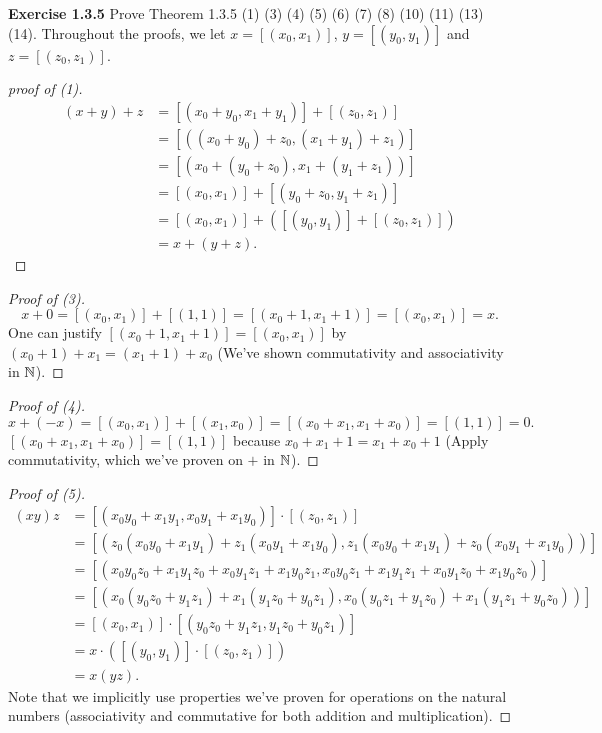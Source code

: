 \newpage
\noindent \textbf{Exercise 1.3.5} Prove Theorem 1.3.5 (1) (3) (4) (5) (6) (7) (8) (10) (11) (13) (14).
Throughout the proofs, we let \(x = [(x_0, x_1)]\), \(y = [(y_0, y_1)]\) and \(z = [(z_0, z_1)]\).
\begin{proof}[proof of (1)]
    \begin{align*}
        (x+y)+z &= [(x_0 + y_0, x_1 + y_1)] + [(z_0, z_1)]\\
        &= [((x_0 + y_0) + z_0, (x_1 + y_1) + z_1)]\\
        &= [(x_0 + (y_0 + z_0), x_1 + (y_1 + z_1))]\\
        &= [(x_0, x_1)] + [(y_0 + z_0, y_1 + z_1)]\\
        &= [(x_0, x_1)] + ([(y_0, y_1)] + [(z_0, z_1)])\\
        &= x + (y+z).
    \end{align*}
\end{proof}
\begin{proof}[Proof of (3)]
    \[x + 0 = [(x_0, x_1)] + [(1,1)] = [(x_0 + 1, x_1 + 1)] = [(x_0, x_1)] = x.\]
    One can justify \([(x_0+1, x_1 + 1)] = [(x_0, x_1)]\) by \((x_0 + 1) + x_1 = (x_1 + 1) + x_0\) (We've shown commutativity and associativity in \(\mathbb{N}\)).
\end{proof}
\begin{proof}[Proof of (4)]
    \[x + (-x) = [(x_0, x_1)] + [(x_1, x_0)] = [(x_0+x_1, x_1+x_0)] = [(1,1)] = 0.\]
    \([(x_0+x_1, x_1+x_0)] = [(1,1)]\) because \(x_0 + x_1 + 1 = x_1 + x_0 + 1\) (Apply commutativity, which we've proven on \(+\) in \(\mathbb{N}\)).
\end{proof}
\begin{proof}[Proof of (5)]
    \begin{align*}
        (xy)z &= [(x_0y_0+x_1y_1, x_0y_1+x_1y_0)] \cdot [(z_0, z_1)] \\
        &= [(z_0(x_0y_0+x_1y_1) + z_1(x_0y_1 + x_1y_0), z_1(x_0y_0 + x_1y_1) + z_0(x_0y_1+x_1y_0))]\\
        &= [(x_0y_0z_0 + x_1y_1z_0 + x_0y_1z_1 + x_1y_0z_1, x_0y_0z_1 + x_1y_1z_1 + x_0y_1z_0 + x_1y_0z_0)]\\
        &= [(x_0(y_0z_0 + y_1z_1) + x_1(y_1z_0 + y_0z_1), x_0(y_0z_1 + y_1z_0) + x_1(y_1z_1 + y_0z_0))]\\
        &= [(x_0, x_1)] \cdot [(y_0z_0 + y_1z_1, y_1z_0 + y_0z_1)]\\
        &= x \cdot ([(y_0, y_1)] \cdot [(z_0, z_1)])\\
        &= x(yz).
    \end{align*}
    Note that we implicitly use properties we've proven for operations on the natural numbers (associativity and commutative for both addition and multiplication).
\end{proof}
